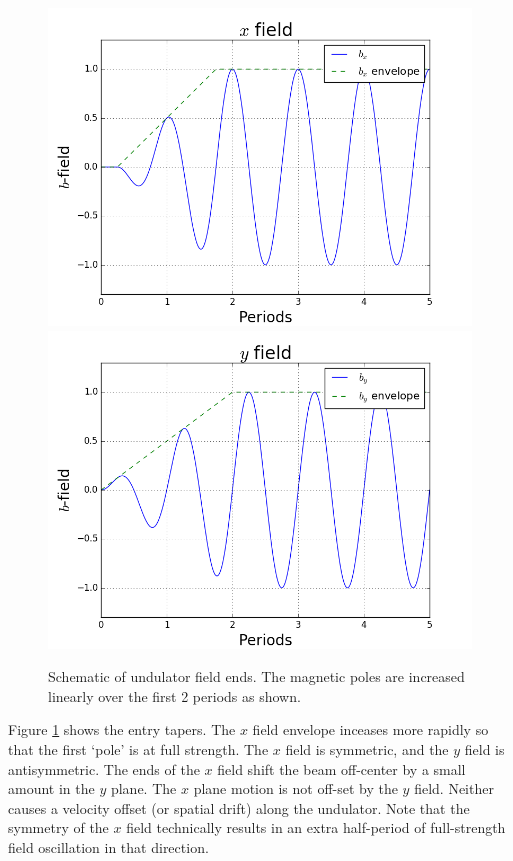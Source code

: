 \documentclass[12pt]{article}%
\begin{document}
\begin{figure}
\centering
\includegraphics[width=120mm]{bx-field.png}
\includegraphics[width=120mm]{by-field.png}
\caption{Schematic of undulator field ends. The magnetic poles are increased linearly over the first 2 periods as shown. }
\label{ends1}
\end{figure}



Figure \ref{ends1} shows the entry tapers. The $x$ field envelope inceases more rapidly so that the first `pole' is at full strength. The $x$ field is symmetric, and the $y$ field is antisymmetric. The ends of the $x$ field shift the beam off-center by a small amount in the $y$ plane. The $x$ plane motion is not off-set by the $y$ field. Neither causes a velocity offset (or spatial drift) along the undulator. Note that the symmetry of the $x$ field technically results in an extra half-period of full-strength field oscillation in that direction.
\end{document}
